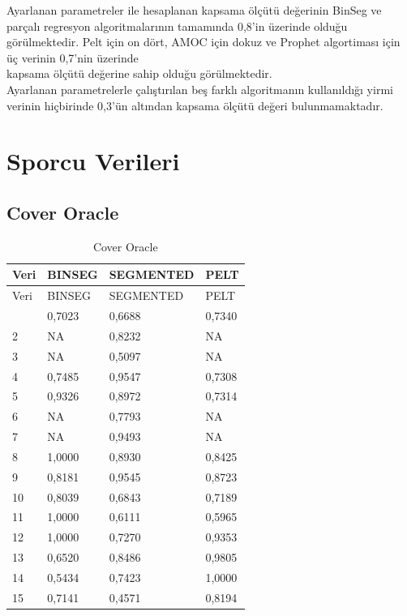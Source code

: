 \documentclass[12pt,twoside]{deuthesis}
\begin{document}
Ayarlanan parametreler ile hesaplanan kapsama ölçütü değerinin BinSeg ve parçalı regresyon algoritmalarının tamamında 0,8'in üzerinde olduğu görülmektedir. Pelt için on dört, AMOC için dokuz ve Prophet algortiması için üç verinin 0,7'nin üzerinde\\
kapsama ölçütü değerine sahip olduğu görülmektedir.\\
Ayarlanan parametrelerle çalıştırılan beş farklı algoritmanın kullanıldığı yirmi verinin hiçbirinde 0,3'ün altından kapsama ölçütü değeri bulunmamaktadır.

\hypertarget{sporcu-verileri}{%
\section{Sporcu Verileri}\label{sporcu-verileri}}

\hypertarget{cover-oracle-1}{%
\subsection{Cover Oracle}\label{cover-oracle-1}}

\begin{longtable}[]{@{}llll@{}}
\caption{\label{tab:nvar11} Cover Oracle}\tabularnewline
\toprule\noalign{}
Veri & BINSEG & SEGMENTED & PELT \\
\midrule\noalign{}
\endfirsthead
\toprule\noalign{}
Veri & BINSEG & SEGMENTED & PELT \\
\midrule\noalign{}
\endhead
\bottomrule\noalign{}
\endlastfoot
1 & 0,7023 & 0,6688 & 0,7340 \\
2 & NA & 0,8232 & NA \\
3 & NA & 0,5097 & NA \\
4 & 0,7485 & 0,9547 & 0,7308 \\
5 & 0,9326 & 0,8972 & 0,7314 \\
6 & NA & 0,7793 & NA \\
7 & NA & 0,9493 & NA \\
8 & 1,0000 & 0,8930 & 0,8425 \\
9 & 0,8181 & 0,9545 & 0,8723 \\
10 & 0,8039 & 0,6843 & 0,7189 \\
11 & 1,0000 & 0,6111 & 0,5965 \\
12 & 1,0000 & 0,7270 & 0,9353 \\
13 & 0,6520 & 0,8486 & 0,9805 \\
14 & 0,5434 & 0,7423 & 1,0000 \\
15 & 0,7141 & 0,4571 & 0,8194 \\
\end{longtable}
\end{document}
